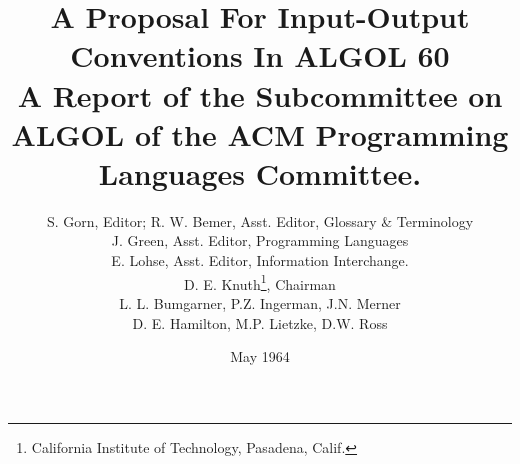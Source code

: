 \documentclass[a4paper,11pt]{article}
\begin{document}
\setcounter{secnumdepth}{5}

\title{A Proposal For Input-Output Conventions In ALGOL 60\\
A Report of the Subcommittee on ALGOL of the ACM Programming Languages Committee.}

\author{S. Gorn, Editor; R. W. Bemer, Asst. Editor, Glossary \& Terminology\\
  J. Green, Asst. Editor, Programming Languages\\
  E. Lohse, Asst. Editor, Information Interchange.\\
  D. E. Knuth\footnote{California Institute of Technology, Pasadena, Calif.}, Chairman\\
  L. L. Bumgarner, P.Z. Ingerman, J.N. Merner\\
  D. E. Hamilton, M.P. Lietzke, D.W. Ross}

\date{May 1964}

\maketitle

\def\keyw#1{{\tt \bf \underline{#1}}}
\def\blankchar{\leavevmode\hbox{\tt\char`\ }}

\def\program#1{{\tt\begin{tabbing}#1\end{tabbing}}}

\def\Algol{{\sc Algol}\space}

\def\mleqv{$\equiv$}
\def\mlnot{$\neg$}
\def\mland{$\wedge$}
\def\mlor{$\vee$}
\def\mlimp{$\Rightarrow$}
\def\mlt{$<$}
\def\mle{$\leq$}
\def\mgt{$>$}
\def\mge{$\geq$}
\def\meq{$=$}
\def\mne{$\neq$}
\def\mpow{$\uparrow$}
\def\mtim{$\times$}
\def\mdiv{$\div$}
\def\ten{\textsubscript{10}}

\def\mychapter#1{{\Huge \bf \vspace{1em}#1}\vspace{1.0em}}
\def\mysection#1{{\Large \bf \vspace{1em}#1}\vspace{1.0em}}
\def\mysubsection#1{{\large \bf \vspace{1em}#1}\vspace{1.0em}}

\def\note#1{{{\it Note.\space}#1}}
\end{document}
